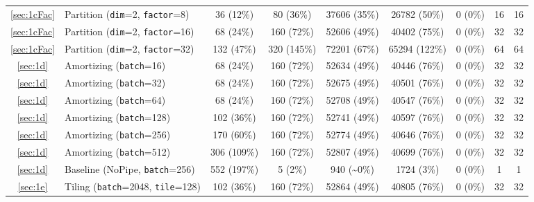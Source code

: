 {\begin{tabularx}{\textwidth}{cl*{5}{c}*{2}{C}}
\ref{sec:1cFac}                     & Partition (\texttt{dim}=2, \texttt{factor}=8) & 36 (12\%) & 80 (36\%) & 37606 (35\%) & 26782 (50\%) & 0 (0\%) & 16 & 16 \\
\ref{sec:1cFac}   & Partition (\texttt{dim}=2, \texttt{factor}=16) & 68 (24\%) & 160 (72\%) & 52606 (49\%) & 40402 (75\%) & 0 (0\%) & 32 & 32 \\
\ref{sec:1cFac}                    & Partition (\texttt{dim}=2, \texttt{factor}=32) & 132 (47\%) & 320 (145\%) & 72201 (67\%) & 65294 (122\%) & 0 (0\%) & 64 & 64 \\
\ref{sec:1d}                             & Amortizing (\texttt{batch}=16) & 68 (24\%) & 160 (72\%) & 52634 (49\%) & 40446 (76\%) & 0 (0\%) & 32 & 32 \\
\ref{sec:1d}                             & Amortizing (\texttt{batch}=32) & 68 (24\%) & 160 (72\%) & 52675 (49\%) & 40501 (76\%) & 0 (0\%) & 32 & 32 \\
\ref{sec:1d}                             & Amortizing (\texttt{batch}=64) & 68 (24\%) & 160 (72\%) & 52708 (49\%) & 40547 (76\%) & 0 (0\%) & 32 & 32 \\
\ref{sec:1d}                            & Amortizing (\texttt{batch}=128) & 102 (36\%) & 160 (72\%) & 52741 (49\%) & 40597 (76\%) & 0 (0\%) & 32 & 32 \\
\ref{sec:1d}           & Amortizing (\texttt{batch}=256) & 170 (60\%) & 160 (72\%) & 52774 (49\%) & 40646 (76\%) & 0 (0\%) & 32 & 32 \\
\ref{sec:1d}                            & Amortizing (\texttt{batch}=512) & 306 (109\%) & 160 (72\%) & 52807 (49\%) & 40699 (76\%) & 0 (0\%) & 32 & 32 \\
\ref{sec:1d}                              & Baseline (NoPipe, \texttt{batch}=256) & 552 (197\%) & 5 (2\%) & 940 (\textasciitilde 0\%) & 1724 (3\%) & 0 (0\%) & 1 & 1 \\
\ref{sec:1e}                                     & Tiling (\texttt{batch}=2048, \texttt{tile}=128) & 102 (36\%) & 160 (72\%) & 52864 (49\%) & 40805 (76\%) & 0 (0\%) & 32 & 32 \\
    \bottomrule
\end{tabularx}
}
